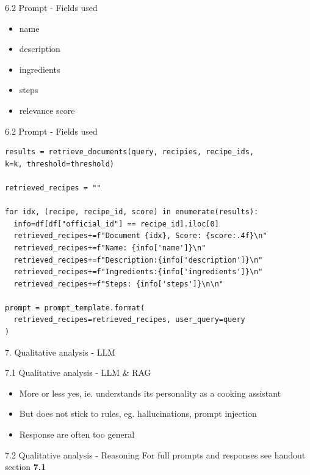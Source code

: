 \documentclass{beamer}
\begin{document}
\begin{frame}{6.2 Prompt - Fields used}
  \begin{itemize}
    \item name
    \item description
    \item ingredients
    \item steps
    \item relevance score
  \end{itemize}
\end{frame}

\begin{frame}[fragile]{6.2 Prompt - Fields used}
  \begin{verbatim}
results = retrieve_documents(query, recipies, recipe_ids, 
k=k, threshold=threshold)

retrieved_recipes = ""

for idx, (recipe, recipe_id, score) in enumerate(results):
  info=df[df["official_id"] == recipe_id].iloc[0]
  retrieved_recipes+=f"Document {idx}, Score: {score:.4f}\n"
  retrieved_recipes+=f"Name: {info['name']}\n"
  retrieved_recipes+=f"Description:{info['description']}\n"
  retrieved_recipes+=f"Ingredients:{info['ingredients']}\n"
  retrieved_recipes+=f"Steps: {info['steps']}\n\n"

prompt = prompt_template.format(
  retrieved_recipes=retrieved_recipes, user_query=query
)
  \end{verbatim}
\end{frame}

\begin{frame}{7. Qualitative analysis - LLM}
\end{frame}

\begin{frame}{7.1 Qualitative analysis - LLM \& RAG}
  \begin{itemize}
    \item More or less yes, ie. understands its personality as a cooking assistant
    \item But does not stick to rules, eg. hallucinations, prompt injection
    \item Response are often too general
  \end{itemize}
\end{frame}


\begin{frame}{7.2 Qualitative analysis - Reasoning}
  For full prompts and responses see handout section \textbf{7.1}
\end{frame}
\end{document}
